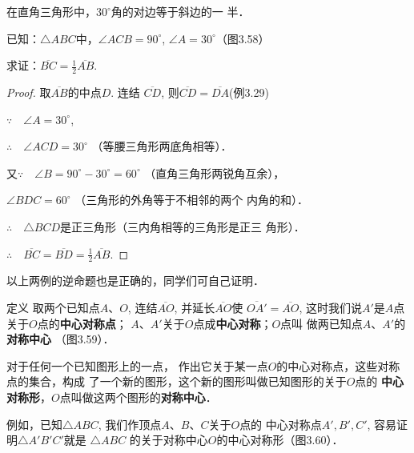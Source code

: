 \begin{example}
    在直角三角形中，$30^{\circ}$角的对边等于斜边的一
半．
\end{example}

已知：$\triangle ABC$中，$\angle ACB=90^{\circ}$, $\angle A=30^{\circ}$（图3.58）

求证：$\overline{BC}=\frac{1}{2}\overline{AB}$.

\begin{proof}
    取$\overline{AB}$的中点$D$. 连结
    $\overline{CD}$, 则$\overline{CD}=\overline{DA}$(例3.29)

$\because\quad \angle A=30^{\circ}$,

$\therefore\quad \angle ACD=30^{\circ}$ （等腰三角形两底角相等）．

又$\because\quad \angle B=90^{\circ} -30^{\circ} =60^{\circ}$ （直角三角形两锐角互余），

$ \angle BDC=60^{\circ}$ （三角形的外角等于不相邻的两个
    内角的和）．

$\therefore\quad \triangle BCD$是正三角形（三内角相等的三角形是正三
    角形）．

$\therefore\quad  \overline{BC}= \overline{BD}=\frac{1}{2} \overline{AB}$.
 \end{proof}

以上两例的逆命题也是正确的，同学们可自己证明．   
    
\begin{blk}
   {定义} 取两个已知点$A$、$O$, 连结$\overline{AO}$, 并延长$\overline{AO}$使
$\overline{OA'}=\overline{AO}$, 这时我们说$A'$是$A$点关于$O$点的\textbf{中心对称点}；
$A$、$A'$关于$O$点成\textbf{中心对称}；$O$点叫
做两已知点$A$、$A'$的\textbf{对称中心}
（图3.59）． 
\end{blk}

\begin{figure}[htp]
    \centering
    \caption{}
\end{figure}

对于任何一个已知图形上的一点，
作出它关于某一点$O$的中心对称点，这些对称点的集合，构成
了一个新的图形，这个新的图形叫做已知图形的关于$O$点的
\textbf{中心对称形}，$O$点叫做这两个图形的\textbf{对称中心}．

例如，已知$\triangle ABC$, 我们作顶点$A$、$B$、$C$关于$O$点的
中心对称点$A',B',C'$, 容易证明$\triangle A'B'C'$就是
$\triangle ABC$
的关于对称中心$O$的中心对称形（图3.60）．

